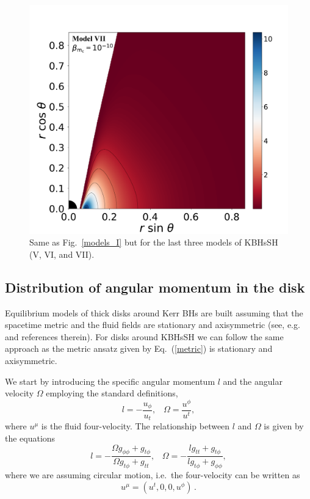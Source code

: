 \documentclass[twocolumn,aps,showpacs,showkeys,prd,superscriptaddress,byrevtex, amsmath]{revtex4-1}
\begin{document}
\begin{figure}
\includegraphics[scale=0.14]{figures/fig2_VII__10.pdf}
\hspace{-0.2cm}
\caption{Same as Fig.~\ref{models_I} but for the last three models of KBHsSH (V, VI, and VII).}
\label{models_II}
\end{figure}

\subsection{Distribution of angular momentum in the disk}

Equilibrium models of thick disks around Kerr BHs are built assuming that the spacetime metric and the fluid fields are stationary and  axisymmetric (see, e.g.~\cite{Font:2002,Daigne:2004,Gimeno-Soler:2017} and references therein). For disks around KBHsSH we can follow the same approach as the metric ansatz given by Eq.~(\ref{metric}) is stationary and axisymmetric.

We start by introducing the specific angular momentum $l$ and the angular velocity $\Omega$ employing the standard definitions,
\begin{equation}
l = - \frac{u_{\phi}}{u_t}, \;\;\; \Omega = \frac{u^{\phi}}{u^t},
\end{equation}
where $u^{\mu}$ is the fluid four-velocity.
The relationship between $l$ and $\Omega$ is given by the equations
\begin{equation}
l = - \frac{\Omega g_{\phi\phi} + g_{t\phi}}{\Omega g_{t\phi} + g_{tt}}, \;\;\; \Omega = - \frac{l g_{tt} + g_{t\phi}}{l g_{t\phi} + g_{\phi\phi}},
\end{equation}
where we are assuming circular motion, i.e.~the four-velocity can be written as
\begin{equation}
u^{\mu} = (u^t, 0, 0, u^{\phi})\,.
\end{equation}
\end{document}

